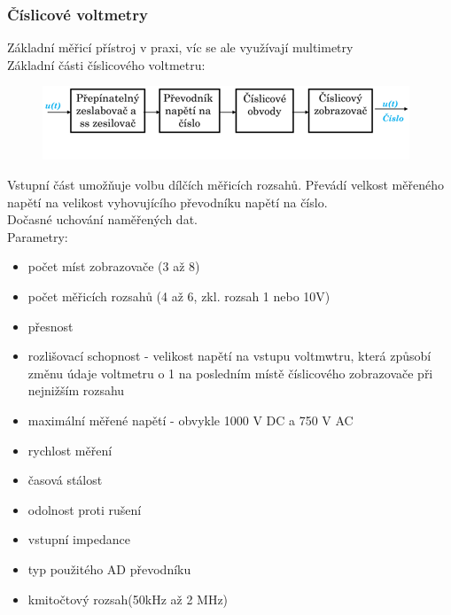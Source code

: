 \subsubsection*{Číslicové voltmetry}
Základní měřicí přístroj v praxi, víc se ale využívají multimetry\\
Základní části číslicového voltmetru:
\begin{figure}[H]
    \includegraphics*[scale = 1.5]{images/cislicovy_voltmetr.png}
\end{figure}
Vstupní část umožňuje volbu dílčích měřicích rozsahů. Převádí velkost měřeného napětí na velikost vyhovujícího převodníku napětí na číslo.\\
Dočasné uchování naměřených dat.\\
Parametry:
\begin{itemize}
    \item počet míst zobrazovače (3 až 8\textonehalf)
    \item počet měřicích rozsahů (4 až 6, zkl. rozsah 1 nebo 10V)
    \item přesnost
    \item rozlišovací schopnost - velikost napětí na vstupu voltmwtru, která způsobí změnu údaje voltmetru o 1 na posledním místě číslicového zobrazovače při nejnižším rozsahu
    \item maximální měřené napětí - obvykle 1000 V DC a 750 V AC
    \item rychlost měření 
    \item časová stálost
    \item odolnost proti rušení
    \item vstupní impedance
    \item typ použitého AD převodníku
    \item kmitočtový rozsah(50kHz až 2 MHz)
\end{itemize}

